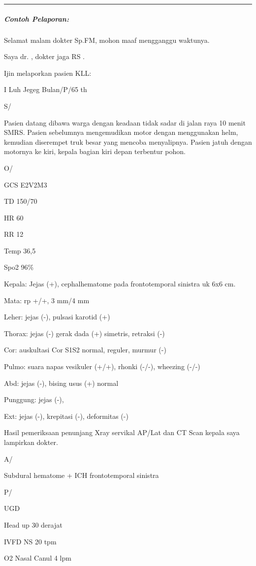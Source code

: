 \documentclass[
]{book}
\begin{document}
\begin{center}\rule{0.5\linewidth}{0.5pt}\end{center}

\hypertarget{contoh-pelaporan-2}{%
\subparagraph{Contoh Pelaporan:}\label{contoh-pelaporan-2}}

Selamat malam dokter Sp.FM, mohon maaf mengganggu waktunya.

Saya dr. , dokter jaga RS .

Ijin melaporkan pasien KLL:

I Luh Jegeg Bulan/P/65 th

S/

Pasien datang dibawa warga dengan keadaan tidak sadar di jalan raya 10 menit SMRS. Pasien sebelumnya mengemudikan motor dengan menggunakan helm, kemudian diserempet truk besar yang mencoba menyalipnya. Pasien jatuh dengan motornya ke kiri, kepala bagian kiri depan terbentur pohon.

O/

GCS E2V2M3

TD 150/70

HR 60

RR 12

Temp 36,5

Spo2 96\%

Kepala: Jejas (+), cephalhematome pada frontotemporal sinistra uk 6x6 cm.

Mata: rp +/+, 3 mm/4 mm

Leher: jejas (-), pulsasi karotid (+)

Thorax: jejas (-) gerak dada (+) simetris, retraksi (-)

Cor: auskultasi Cor S1S2 normal, reguler, murmur (-)

Pulmo: suara napas vesikuler (+/+), rhonki (-/-), wheezing (-/-)

Abd: jejas (-), bising usus (+) normal

Punggung: jejas (-),

Ext: jejas (-), krepitasi (-), deformitas (-)

Hasil pemeriksaan penunjang Xray servikal AP/Lat dan CT Scan kepala saya lampirkan dokter.

A/

Subdural hematome + ICH frontotemporal sinistra

P/

UGD

Head up 30 derajat

IVFD NS 20 tpm

O2 Nasal Canul 4 lpm
\end{document}
